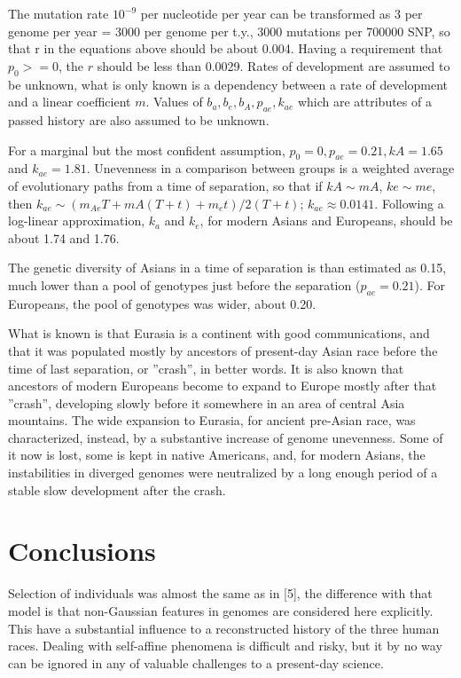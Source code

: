 \documentclass[a4paper]{article}
\begin{document}
The mutation rate $10^{-9}$ per nucleotide per year can be transformed as 3 per genome per year = 3000 per
genome per t.y., 3000 mutations per 700000 SNP, so that r in the equations above should be about 0.004.
Having a requirement that $p_0 >= 0$, the $r$ should be less than 0.0029. Rates of development are assumed to be unknown,
what is only known is a dependency between a rate of development and a linear coefficient $m$. Values of
$b_a, b_e, b_A, p_{ae}, k_{ae}$ which are attributes of a passed history are also assumed to be unknown.


For a marginal but the most confident assumption, $p_0 = 0, p_{ae} = 0.21, kA = 1.65$ and $k_{ae} = 1.81$. Unevenness in a comparison between groups is a weighted
average of evolutionary paths from a time of separation, so that if $kA \sim mA$, $ke \sim me$, then $k_{ae} \sim (m_{Ae}T + mA(T + t) + m_e t)/2(T + t)$; $k_{ae} \approx 0.0141$. Following a log-linear approximation, $k_a$ and $k_e$, for modern Asians and Europeans, should be about 1.74 and 1.76.

The genetic diversity of Asians in a time of separation is than estimated as 0.15, much lower than a pool of genotypes just before the separation ($p_{ae} = 0.21$). For Europeans, the pool of genotypes was wider, about 0.20.

What is known is that Eurasia is a continent with good communications, and that it was populated
mostly by ancestors of present-day Asian race before the time of last separation, or ''crash'', in better words.
It is also known that ancestors of modern Europeans become to expand to Europe mostly after that ''crash'',
developing slowly before it somewhere in an area of central Asia mountains. The wide expansion to Eurasia,
for ancient pre-Asian race, was characterized, instead, by a substantive increase of genome unevenness. Some
of it now is lost, some is kept in native Americans, and, for modern Asians, the instabilities in diverged
genomes were neutralized by a long enough period of a stable slow development after the crash.


\section{Conclusions}

Selection of individuals was almost the same as in [5], the difference with that model is that non-Gaussian features in genomes are considered here explicitly. This
have a substantial influence to a reconstructed history of the three human races. Dealing with self-affine phenomena is difficult and risky, but it by no way can be ignored in any of valuable challenges to a present-day
science.
\end{document}
